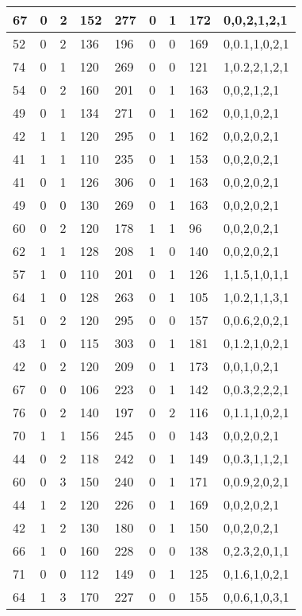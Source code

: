 \documentclass{article}
\begin{document}
\begin{table}[h!]
\begin{tabular}{|l|l|l|l|l|l|l|l|l|}
67 & 0 & 2 & 152 & 277 & 0 & 1 & 172 & 0,0,2,1,2,1 \\ \hline
52 & 0 & 2 & 136 & 196 & 0 & 0 & 169 & 0,0.1,1,0,2,1 \\ \hline
74 & 0 & 1 & 120 & 269 & 0 & 0 & 121 & 1,0.2,2,1,2,1 \\ \hline
54 & 0 & 2 & 160 & 201 & 0 & 1 & 163 & 0,0,2,1,2,1 \\ \hline
49 & 0 & 1 & 134 & 271 & 0 & 1 & 162 & 0,0,1,0,2,1 \\ \hline
42 & 1 & 1 & 120 & 295 & 0 & 1 & 162 & 0,0,2,0,2,1 \\ \hline
41 & 1 & 1 & 110 & 235 & 0 & 1 & 153 & 0,0,2,0,2,1 \\ \hline
41 & 0 & 1 & 126 & 306 & 0 & 1 & 163 & 0,0,2,0,2,1 \\ \hline
49 & 0 & 0 & 130 & 269 & 0 & 1 & 163 & 0,0,2,0,2,1 \\ \hline
60 & 0 & 2 & 120 & 178 & 1 & 1 & 96 & 0,0,2,0,2,1 \\ \hline
62 & 1 & 1 & 128 & 208 & 1 & 0 & 140 & 0,0,2,0,2,1 \\ \hline
57 & 1 & 0 & 110 & 201 & 0 & 1 & 126 & 1,1.5,1,0,1,1 \\ \hline
64 & 1 & 0 & 128 & 263 & 0 & 1 & 105 & 1,0.2,1,1,3,1 \\ \hline
51 & 0 & 2 & 120 & 295 & 0 & 0 & 157 & 0,0.6,2,0,2,1 \\ \hline
43 & 1 & 0 & 115 & 303 & 0 & 1 & 181 & 0,1.2,1,0,2,1 \\ \hline
42 & 0 & 2 & 120 & 209 & 0 & 1 & 173 & 0,0,1,0,2,1 \\ \hline
67 & 0 & 0 & 106 & 223 & 0 & 1 & 142 & 0,0.3,2,2,2,1 \\ \hline
76 & 0 & 2 & 140 & 197 & 0 & 2 & 116 & 0,1.1,1,0,2,1 \\ \hline
70 & 1 & 1 & 156 & 245 & 0 & 0 & 143 & 0,0,2,0,2,1 \\ \hline
44 & 0 & 2 & 118 & 242 & 0 & 1 & 149 & 0,0.3,1,1,2,1 \\ \hline
60 & 0 & 3 & 150 & 240 & 0 & 1 & 171 & 0,0.9,2,0,2,1 \\ \hline
44 & 1 & 2 & 120 & 226 & 0 & 1 & 169 & 0,0,2,0,2,1 \\ \hline
42 & 1 & 2 & 130 & 180 & 0 & 1 & 150 & 0,0,2,0,2,1 \\ \hline
66 & 1 & 0 & 160 & 228 & 0 & 0 & 138 & 0,2.3,2,0,1,1 \\ \hline
71 & 0 & 0 & 112 & 149 & 0 & 1 & 125 & 0,1.6,1,0,2,1 \\ \hline
64 & 1 & 3 & 170 & 227 & 0 & 0 & 155 & 0,0.6,1,0,3,1 \\ \hline

\end{tabular}
\end{table}
\end{document}
